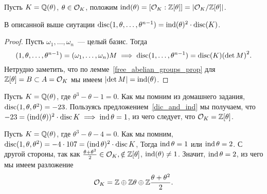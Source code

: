 		\begin{definition} 
			Пусть $K = \mathbb{Q}(\theta)$, $\theta \in \mathcal{O}_{K}$, положим $\operatorname{ind}(\theta) = [\mathcal{O}_{K} : \mathbb{Z}[\theta]] = \left\lvert \mathcal{O}_{K}/\mathbb{Z}[\theta] \right\rvert$. 	
		\end{definition}

		

		\begin{statement}\label{dic_and_ind} 
			В описанной выше сиутации $\operatorname{disc}(1, \theta, \ldots, \theta^{n - 1}) = \operatorname{ind}(\theta)^{2} \cdot \operatorname{disc}(K)$.
		\end{statement}
		\begin{proof}
			Пусть $\omega_{1}, \ldots, \omega_{n}$~--- целый базис. Тогда 
			\[
				(1, \theta, \ldots, \theta^{n - 1}) = (\omega_{1}, \ldots, \omega_{n})M \implies \disc(1, \ldots, \theta^{n - 1}) = \disc(K) \lr*{\det{M}}^{2}.
			\]
			Нетрудно заметить, что по лемме~\ref{free_abelian_groups_prop} для $\mathbb{Z}[\theta] = B \subset A = \mathcal{O}_{K}$ мы имеем $\left\lvert \det{M} \right\rvert = \operatorname{ind}(\theta)$.
			
		\end{proof}

		\begin{example}
			Пусть $K = \mathbb{Q}(\theta)$, где $\theta^3 - \theta - 1 = 0$. Как мы помним из домашнего задания, $\operatorname{disc}(1, \theta, \theta^2) = -23$.  Пользуясь предложением~\ref{dic_and_ind} мы получаем, что $-23 = (\operatorname{ind}(\theta))^2 \cdot \operatorname{disc}{K} \implies \operatorname{ind}{\theta} = 1$, из чего следует, что $\mathcal{O}_{K} = \mathbb{Z}[\theta]$.
		\end{example}

		\begin{example}
			Пусть $K = \mathbb{Q}(\theta)$, где $\theta^3 - \theta - 4 = 0$. Как мы помним, $\operatorname{disc}(1, \theta, \theta^2) = -4 \cdot 107 = (\operatorname{ind}{\theta})^2 \cdot \operatorname{disc}{K}$, Тогда $\operatorname{ind}{\theta} = 1$ или $\operatorname{ind}{\theta} = 2$. С другой стороны, так как $\frac{\theta + \theta^2}{2} \in \mathcal{O}_{K}, \notin \mathbb{Z}[\theta]$, $\operatorname{ind}(\theta) \neq 1$. Значит, $\operatorname{ind}{\theta} = 2$,  из чего мы имеем разложение 
			\[
				\mathcal{O}_{K} = \mathbb{Z} \oplus \mathbb{Z}\theta \oplus \mathbb{Z} \frac{\theta + \theta^2}{2}.
			\]
		\end{example}

